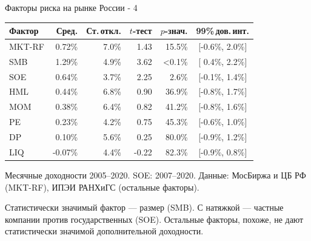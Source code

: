 \documentclass{beamer}
\begin{document}
\begin{frame}{Факторы риска на рынке России - 4}
\centering
\begin{tabular}{l|r|r|r|r|c}
Фактор & Сред. & Ст.\,откл. & $t$-тест & $p$-знач. & 99\%\,дов.\,инт. \\
\hline
MKT-RF  &  0.72\% & 7.0\% &  1.43 & 15.5\% & [-0.6\%, 2.0\%] \\
SMB     &  1.29\% & 4.9\% &  3.62 & <0.1\% & [ 0.4\%, 2.2\%] \\ 
SOE     &  0.64\% & 3.7\% &  2.25 &  2.6\% & [-0.1\%, 1.4\%] \\
HML     &  0.44\% & 6.8\% &  0.90 & 36.9\% & [-0.8\%, 1.7\%] \\
MOM     &  0.38\% & 6.4\% &  0.82 & 41.2\% & [-0.8\%, 1.6\%] \\  
PE      &  0.23\% & 4.2\% &  0.75 & 45.3\% & [-0.6\%, 1.0\%] \\
DP      &  0.10\% & 5.6\% &  0.25 & 80.0\% & [-0.9\%, 1.2\%] \\
LIQ     & -0.07\% & 4.4\% & -0.22 & 82.3\% & [-0.9\%, 0.8\%] \\ \hline
\end{tabular}

\justify
{\scriptsize Месячные доходности 2005--2020. SOE: 2007--2020. Данные: МосБиржа 
и ЦБ РФ (MKT-RF), ИПЭИ РАНХиГС (остальные факторы).}

\justify
Статистически значимый фактор --- размер (SMB). С натяжкой ---  частные 
компании против государственных (SOE). Остальные факторы, похоже, не дают 
статистически значимой дополнительной доходности.
\end{frame}
\end{document}
